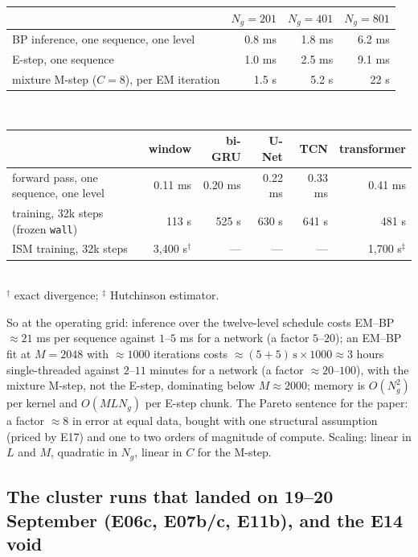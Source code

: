 \begin{center}\small
\begin{tabular}{@{}lrrr@{}}
\toprule
 & $N_g=201$ & $N_g=401$ & $N_g=801$ \\
\midrule
BP inference, one sequence, one level & 0.8 ms & 1.8 ms & 6.2 ms \\
E-step, one sequence & 1.0 ms & 2.5 ms & 9.1 ms \\
mixture M-step ($C=8$), per EM iteration & 1.5 s & 5.2 s & 22 s \\
\midrule
\bottomrule
\end{tabular}\\[6pt]
\begin{tabular}{@{}lrrrrr@{}}
\toprule
 & window & bi-GRU & U-Net & TCN & transformer \\
\midrule
forward pass, one sequence, one level & 0.11 ms & 0.20 ms & 0.22 ms & 0.33 ms & 0.41 ms \\
training, 32k steps (frozen \texttt{wall}) & 113 s & 525 s & 630 s & 641 s & 481 s \\
ISM training, 32k steps & 3{,}400 s$^\dagger$ & --- & --- & --- & 1{,}700 s$^\ddagger$ \\
\bottomrule
\end{tabular}\\[2pt]
{\footnotesize $^\dagger$ exact divergence; $^\ddagger$ Hutchinson estimator.}
\end{center}
So at the operating grid: inference over the twelve-level schedule costs EM--BP $\approx21$ ms per sequence against $1$--$5$ ms for a network (a factor $5$--$20$); an EM--BP fit at $M=2048$ with $\approx1000$ iterations costs $\approx(5+5)\,\mathrm{s}\times1000\approx3$ hours single-threaded against $2$--$11$ minutes for a network (a factor $\approx20$--$100$), with the mixture M-step, not the E-step, dominating below $M\approx2000$; memory is $O(N_g^2)$ per kernel and $O(ML N_g)$ per E-step chunk. The Pareto sentence for the paper: a factor $\approx8$ in error at equal data, bought with one structural assumption (priced by E17) and one to two orders of magnitude of compute. Scaling: linear in $L$ and $M$, quadratic in $N_g$, linear in $C$ for the M-step.

\subsection{The cluster runs that landed on 19--20 September (E06c, E07b/c, E11b), and the E14 void}
\label{sec:landed}

